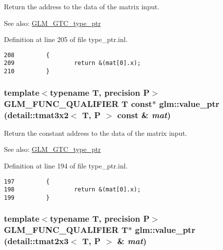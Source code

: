 Return the address to the data of the matrix input. \begin{Desc}
\item[See also:]\hyperlink{group__gtc__type__ptr}{GLM\_\-GTC\_\-type\_\-ptr} \end{Desc}


Definition at line 205 of file type\_\-ptr.inl.

\begin{Code}\begin{verbatim}208         {
209                 return &(mat[0].x);
210         }
\end{verbatim}
\end{Code}


\hypertarget{group__gtc__type__ptr_g3ad2904b61a8c3fe50ccb6222e6e928c}{
\subsubsection[value\_\-ptr]{\setlength{\rightskip}{0pt plus 5cm}template$<$typename T, precision P$>$ GLM\_\-FUNC\_\-QUALIFIER T const$\ast$ glm::value\_\-ptr (detail::tmat3x2$<$ T, P $>$ const \& {\em mat})}}
\label{group__gtc__type__ptr_g3ad2904b61a8c3fe50ccb6222e6e928c}


Return the constant address to the data of the matrix input. \begin{Desc}
\item[See also:]\hyperlink{group__gtc__type__ptr}{GLM\_\-GTC\_\-type\_\-ptr} \end{Desc}


Definition at line 194 of file type\_\-ptr.inl.

\begin{Code}\begin{verbatim}197         {
198                 return &(mat[0].x);
199         }
\end{verbatim}
\end{Code}


\hypertarget{group__gtc__type__ptr_g12dda3f2717411f15a1a317a82113f14}{
\subsubsection[value\_\-ptr]{\setlength{\rightskip}{0pt plus 5cm}template$<$typename T, precision P$>$ GLM\_\-FUNC\_\-QUALIFIER T$\ast$ glm::value\_\-ptr (detail::tmat2x3$<$ T, P $>$ \& {\em mat})}}
\label{group__gtc__type__ptr_g12dda3f2717411f15a1a317a82113f14}


